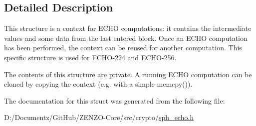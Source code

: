 \subsection{Detailed Description}
This structure is a context for E\+C\+HO computations\+: it contains the intermediate values and some data from the last entered block. Once an E\+C\+HO computation has been performed, the context can be reused for another computation. This specific structure is used for E\+C\+H\+O-\/224 and E\+C\+H\+O-\/256.

The contents of this structure are private. A running E\+C\+HO computation can be cloned by copying the context (e.\+g. with a simple {\ttfamily memcpy()}). 

The documentation for this struct was generated from the following file\+:\begin{DoxyCompactItemize}
\item 
D\+:/\+Documentz/\+Git\+Hub/\+Z\+E\+N\+Z\+O-\/\+Core/src/crypto/\mbox{\hyperlink{sph__echo_8h}{sph\+\_\+echo.\+h}}\end{DoxyCompactItemize}
